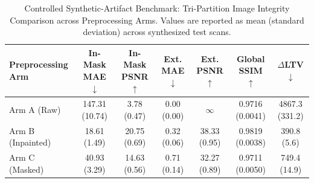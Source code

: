 \begin{table}[t]
\centering
\caption{Controlled Synthetic-Artifact Benchmark: Tri-Partition Image Integrity Comparison across Preprocessing Arms. Values are reported as mean (standard deviation) across synthesized test scans.}
\label{tab:synthetic_integrity}
\small
\begin{tabular}{lcccccc}
\toprule
\textbf{Preprocessing Arm} & \textbf{In-Mask MAE} $\downarrow$ & \textbf{In-Mask PSNR} $\uparrow$ & \textbf{Ext. MAE} $\downarrow$ & \textbf{Ext. PSNR} $\uparrow$ & \textbf{Global SSIM} $\uparrow$ & $\Delta$\textbf{LTV} $\downarrow$ \\
\midrule
Arm A (Raw) & 147.31 (10.74) & 3.78 (0.47) & 0.00 (0.00) & $\infty$ & 0.9716 (0.0041) & 4867.3 (331.2) \\
Arm B (Inpainted) & 18.61 (1.49) & 20.75 (0.69) & 0.32 (0.06) & 38.33 (0.95) & 0.9819 (0.0038) & 390.8 (5.6) \\
Arm C (Masked) & 40.93 (3.29) & 14.63 (0.56) & 0.71 (0.14) & 32.27 (0.89) & 0.9711 (0.0050) & 749.4 (14.9) \\
\bottomrule
\end{tabular}
\end{table}
